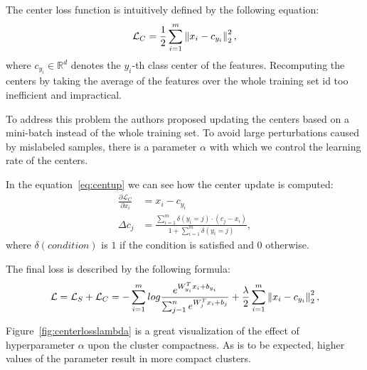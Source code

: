 The center loss function is intuitively defined by the following equation:
\begin{equation}
    \label{eq:center}
    \mathcal{L}_C = \frac{1}{2} \sum_{i=1}^{m} \left\lVert x_i - c_{y_i}\right\rVert_2^2,
\end{equation}
where $c_{y_i} \in \mathbb{R}^{d}$ denotes the $y_i$-th class center of the features.
Recomputing the centers by taking the average of the features over the whole training set id too inefficient and
impractical.

To address this problem the authors proposed updating the centers based on a mini-batch instead of the whole training
set.
To avoid large perturbations caused by mislabeled samples, there is a parameter $\alpha$ with which we control the
learning rate of the centers.

In the equation~\ref{eq:centup} we can see how the center update is computed:
\begin{align}
    \frac{\partial \mathcal{L}_C}{\partial x_i} &= x_i - c_{y_i} \\
    \Delta c_j &= \frac{\sum_{i=1}^m \delta(y_i=j) \cdot (c_j-x_i)}{1+\sum_{i=1}^m \delta(y_i=j)}, \label{eq:centup}
\end{align}
where $\delta(condition)$ is $1$ if the condition is satisfied and $0$ otherwise.

The final loss is described by the following formula:
\begin{equation}
    \label{eq:centerloss}
    \mathcal{L} = \mathcal{L}_S + \mathcal{L}_C = -\sum_{i=1}^{m} log \frac{e^{W^T_{y_i} x_{i} + b_{y_i}}}
    {\sum_{j-1}^{n} e^{W^T_{j} x_{i} + b_{j}}} + \frac{\lambda}{2} \sum_{i=1}^{m} \left\lVert x_i - c_{y_i}\right\rVert_2^2,
\end{equation}

Figure~\ref{fig:centerlosslambda} is a great visualization of the effect of hyperparameter $\alpha$ upon the cluster
compactness.
As is to be expected, higher values of the parameter result in more compact clusters.

